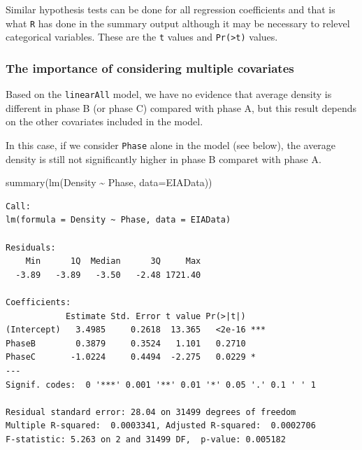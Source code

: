 \documentclass[
  oneside]{krantz}
\newenvironment{Shaded}{\begin{snugshade}}{\end{snugshade}}
\newcommand{\AttributeTok}[1]{\textcolor[rgb]{0.77,0.63,0.00}{#1}}
\newcommand{\FunctionTok}[1]{\textcolor[rgb]{0.00,0.00,0.00}{#1}}
\newcommand{\NormalTok}[1]{#1}
\newcommand{\SpecialCharTok}[1]{\textcolor[rgb]{0.00,0.00,0.00}{#1}}
\begin{document}
Similar hypothesis tests can be done for all regression coefficients and that is what \texttt{R} has done in the summary output although it may be necessary to relevel categorical variables. These are the \texttt{t} values and \texttt{Pr(\textgreater{}\textbar{}t\textbar{})} values.

\hypertarget{the-importance-of-considering-multiple-covariates}{%
\subsubsection{The importance of considering multiple covariates}\label{the-importance-of-considering-multiple-covariates}}

Based on the \texttt{linearAll} model, we have no evidence that average density is different in phase B (or phase C) compared with phase A, but this result depends on the other covariates included in the model.

In this case, if we consider \texttt{Phase} alone in the model (see below), the average density is still not significantly higher in phase B comparet with phase A.

\small

\begin{Shaded}
\begin{Highlighting}[]
\FunctionTok{summary}\NormalTok{(}\FunctionTok{lm}\NormalTok{(Density }\SpecialCharTok{\textasciitilde{}}\NormalTok{ Phase, }\AttributeTok{data=}\NormalTok{EIAData))}
\end{Highlighting}
\end{Shaded}

\begin{verbatim}
Call:
lm(formula = Density ~ Phase, data = EIAData)

Residuals:
    Min      1Q  Median      3Q     Max 
  -3.89   -3.89   -3.50   -2.48 1721.40 

Coefficients:
            Estimate Std. Error t value Pr(>|t|)    
(Intercept)   3.4985     0.2618  13.365   <2e-16 ***
PhaseB        0.3879     0.3524   1.101   0.2710    
PhaseC       -1.0224     0.4494  -2.275   0.0229 *  
---
Signif. codes:  0 '***' 0.001 '**' 0.01 '*' 0.05 '.' 0.1 ' ' 1

Residual standard error: 28.04 on 31499 degrees of freedom
Multiple R-squared:  0.0003341, Adjusted R-squared:  0.0002706 
F-statistic: 5.263 on 2 and 31499 DF,  p-value: 0.005182
\end{verbatim}

\normalsize
\end{document}
